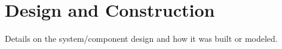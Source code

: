 \chapter{Design and Construction}
Details on the system/component design and how it was built or modeled.